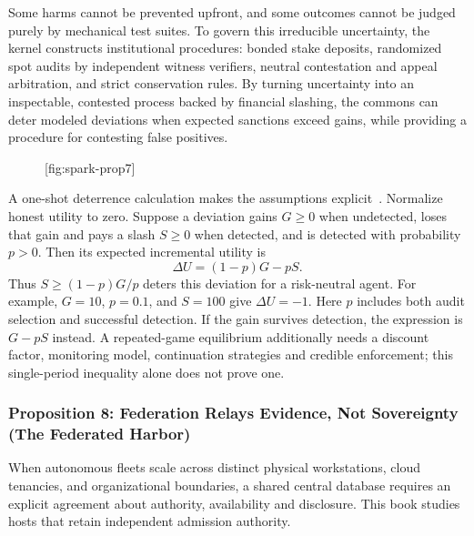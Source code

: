 \documentclass[11pt,a4paper]{article}
\providecommand{\pdchapref}[2]{\textbf{#2}}
\begin{document}
Some harms cannot be prevented upfront, and some outcomes cannot be judged purely by mechanical test suites. To govern this irreducible uncertainty, the kernel constructs institutional procedures: bonded stake deposits, randomized spot audits by independent witness verifiers, neutral contestation and appeal arbitration, and strict conservation rules. By turning uncertainty into an inspectable, contested process backed by financial slashing, the commons can deter modeled deviations when expected sanctions exceed gains, while providing a procedure for contesting false positives.

\begin{figure}[tp]
  \centering
  [fig:spark-prop7]
\end{figure}

A one-shot deterrence calculation makes the assumptions explicit~. Normalize honest utility to zero. Suppose a deviation gains $G\ge0$ when undetected, loses that gain and pays a slash $S\ge0$ when detected, and is detected with probability $p>0$. Then its expected incremental utility is
\begin{equation}
\Delta U=(1-p)G-pS.
\end{equation}
Thus $S\ge(1-p)G/p$ deters this deviation for a risk-neutral agent. For example, $G=10$, $p=0.1$, and $S=100$ give $\Delta U=-1$. Here $p$ includes both audit selection and successful detection. If the gain survives detection, the expression is $G-pS$ instead. A repeated-game equilibrium additionally needs a discount factor, monitoring model, continuation strategies and credible enforcement; this single-period inequality alone does not prove one.

\subsubsection*{Proposition 8: Federation Relays Evidence, Not Sovereignty (\pdchapref{fh}{The Federated Harbor})}
When autonomous fleets scale across distinct physical workstations, cloud tenancies, and organizational boundaries, a shared central database requires an explicit agreement about authority, availability and disclosure. This book studies hosts that retain independent admission authority.
\end{document}
